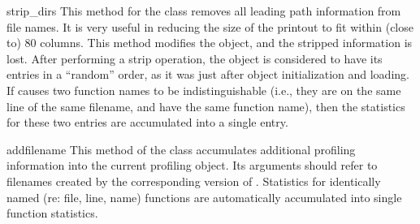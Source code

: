 \begin{methoddesc}[Stats]{strip_dirs}{}
This method for the  class removes all leading path
information from file names.  It is very useful in reducing the size
of the printout to fit within (close to) 80 columns.  This method
modifies the object, and the stripped information is lost.  After
performing a strip operation, the object is considered to have its
entries in a ``random'' order, as it was just after object
initialization and loading.  If  causes two
function names to be indistinguishable (i.e., they are on the same
line of the same filename, and have the same function name), then the
statistics for these two entries are accumulated into a single entry.
\end{methoddesc}


\begin{methoddesc}[Stats]{add}{filename}
This method of the  class accumulates additional
profiling information into the current profiling object.  Its
arguments should refer to filenames created by the corresponding
version of .  Statistics for identically named
(re: file, line, name) functions are automatically accumulated into
single function statistics.
\end{methoddesc}


